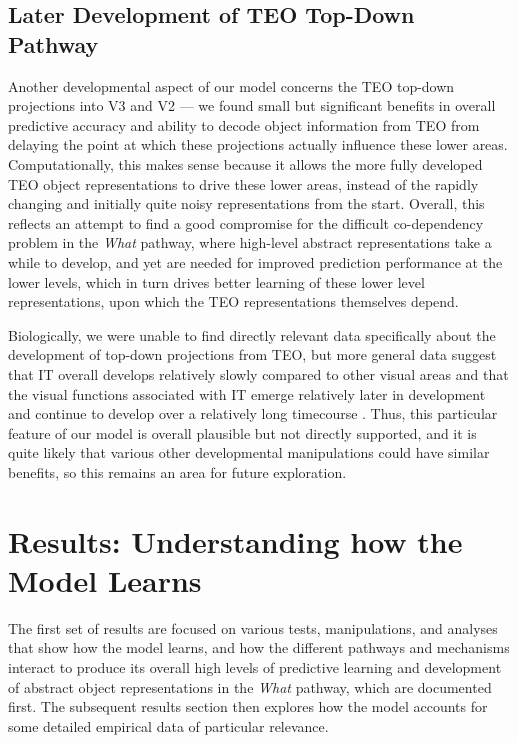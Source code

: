 \documentclass[11pt,twoside]{article}
\newif\myifpdf
\begin{document}
\subsection{Later Development of TEO Top-Down Pathway}

Another developmental aspect of our model concerns the TEO top-down projections into V3 and V2 --- we found small but significant benefits in overall predictive accuracy and ability to decode object information from TEO from delaying the point at which these projections actually influence these lower areas.  Computationally, this makes sense because it allows the more fully developed TEO object representations to drive these lower areas, instead of the rapidly changing and initially quite noisy representations from the start.  Overall, this reflects an attempt to find a good compromise for the difficult co-dependency problem in the {\em What} pathway, where high-level abstract representations take a while to develop, and yet are needed for improved prediction performance at the lower levels, which in turn drives better learning of these lower level representations, upon which the TEO representations themselves depend.

Biologically, we were unable to find directly relevant data specifically about the development of top-down projections from TEO, but more general data suggest that IT overall develops relatively slowly compared to other visual areas \cite{Rodman94} and that the visual functions associated with IT emerge relatively later in development and continue to develop over a relatively long timecourse \cite{NishimuraScherfBehrmann09}.  Thus, this particular feature of our model is overall plausible but not directly supported, and it is quite likely that various other developmental manipulations could have similar benefits, so this remains an area for future exploration.

\section{Results: Understanding how the Model Learns}

The first set of results are focused on various tests, manipulations, and analyses that show how the model learns, and how the different pathways and mechanisms interact to produce its overall high levels of predictive learning and development of abstract object representations in the {\em What} pathway, which are documented first.  The subsequent results section then explores how the model accounts for some detailed empirical data of particular relevance.
\end{document}
